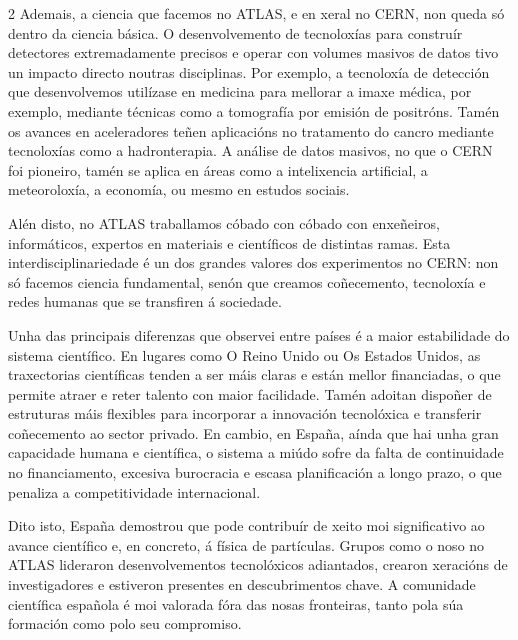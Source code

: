 \begin{multicols}{2}
Ademais, a ciencia que facemos no ATLAS, e en xeral no CERN, non queda só
dentro da ciencia básica. O desenvolvemento de tecnoloxías para construír
detectores extremadamente precisos e operar con volumes masivos de datos tivo
un impacto directo noutras disciplinas. Por exemplo, a tecnoloxía de detección
que desenvolvemos utilízase en medicina para mellorar a imaxe médica, por
exemplo, mediante técnicas como a tomografía por emisión de positróns. Tamén os
avances en aceleradores teñen aplicacións no tratamento do cancro mediante
tecnoloxías como a hadronterapia. A análise de datos masivos, no que o CERN foi
pioneiro, tamén se aplica en áreas como a intelixencia artificial, a
meteoroloxía, a economía, ou mesmo en estudos sociais.

Alén disto, no ATLAS traballamos cóbado con cóbado con enxeñeiros,
informáticos, expertos en materiais e científicos de distintas ramas. Esta
interdisciplinariedade é un dos grandes valores dos experimentos no CERN: non
só facemos ciencia fundamental, senón que creamos coñecemento, tecnoloxía e
redes humanas que se transfiren á sociedade.


Unha das principais diferenzas que observei entre países é a maior estabilidade
do sistema científico. En lugares como O Reino Unido ou Os Estados Unidos, as
traxectorias científicas tenden a ser máis claras e están mellor financiadas, o
que permite atraer e reter talento con maior facilidade. Tamén adoitan dispoñer
de estruturas máis flexibles para incorporar a innovación tecnolóxica e
transferir coñecemento ao sector privado. En cambio, en España, aínda que hai
unha gran capacidade humana e científica, o sistema a miúdo sofre da falta de
continuidade no financiamento, excesiva burocracia e escasa planificación a
longo prazo, o que penaliza a competitividade internacional.

Dito isto, España demostrou que pode contribuír de xeito moi significativo ao
avance científico e, en concreto, á física de partículas. Grupos como o noso no
ATLAS lideraron desenvolvementos tecnolóxicos adiantados, crearon xeracións de
investigadores e estiveron presentes en descubrimentos chave. A comunidade
científica española é moi valorada fóra das nosas fronteiras, tanto pola súa
formación como polo seu compromiso.


\end{multicols}

